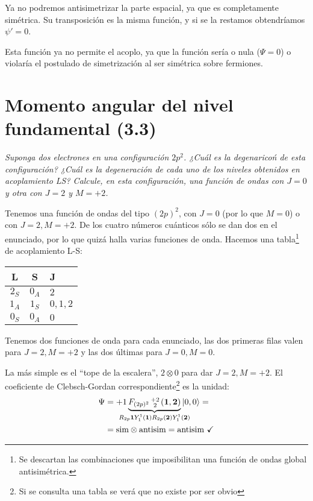 Ya no podremos antisimetrizar la parte espacial, ya que es
completamente simétrica. Su transposición es la misma función, y si se
la restamos obtendríamos $\psi'=0$.

Esta función ya no permite el acoplo, ya que la función sería o nula
($\Psi=0$) o violaría el postulado de simetrización al ser simétrica
sobre fermiones.

\chapter{Momento angular del nivel fundamental (3.3)}
\begin{tcolorbox}[halign=left]
  \emph{
    Suponga dos electrones en una configuración $2p^2$. ¿Cuál es la
    degenaricoń de esta configuración? ¿Cuál es la degeneración de
    cada uno de los niveles obtenidos en acoplamiento LS? Calcule, en
    esta configuración, una función de ondas con $J=0$ y otra con
    $J=2$ y $M=+2$.
}
\end{tcolorbox}
Tenemos una función de ondas del tipo $(2p)^2$, con $J=0$ (por lo que
$M=0$) o con $J=2,M=+2$. De los cuatro números cuánticos sólo se dan
dos en el enunciado, por lo que quizá halla varias funciones de onda.
Hacemos una tabla\footnote{Se descartan las combinaciones que
  imposibilitan una función de ondas global antisimétrica.} de acoplamiento L-S:
\begin{center}
  \begin{tabular}{ccl}
    L & S & J \\ \hline
    $2_S$ & $0_A$ & $2$  \\ 
    $1_A$ & $1_S$ & $0,1,2$ \\ 
    $0_S$ & $0_A$ & $0$ \\ 
  \end{tabular}
\end{center}
Tenemos dos funciones de onda para cada enunciado, las dos primeras
filas valen para $J=2,M=+2$ y las dos últimas para $J=0,M=0$. 

La más simple es el ``tope de la escalera'', $2\otimes 0$ para dar $J=2, M=+2$. El
coeficiente de Clebsch-Gordan correspondiente\footnote{Si se consulta
una tabla se verá que no existe por ser obvio} es la unidad:
\begin{equation}
  \begin{split}
    \Psi &=+1 \underbrace{F_{(2p)^2} \smqty{+2\\ 2} (\boldrm{1},\boldrm{2})}_{
      \mathclap{
        R_{2p}\boldrm{1}Y_1^1(\boldrm{1})R_{2p}(\boldrm{2})Y^1_1(\boldrm{2})
      } } \ket{0,0} = \\
    &= \text{sim} \otimes \text{antisim} = \text{antisim} \  \checkmark
  \end{split}
\end{equation}

